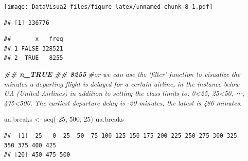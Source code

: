 \documentclass[
]{article}
\newenvironment{Shaded}{\begin{snugshade}}{\end{snugshade}}
\newcommand{\CommentTok}[1]{\textcolor[rgb]{0.56,0.35,0.01}{\textit{#1}}}
\newcommand{\DecValTok}[1]{\textcolor[rgb]{0.00,0.00,0.81}{#1}}
\newcommand{\DocumentationTok}[1]{\textcolor[rgb]{0.56,0.35,0.01}{\textbf{\textit{#1}}}}
\newcommand{\FunctionTok}[1]{\textcolor[rgb]{0.00,0.00,0.00}{#1}}
\newcommand{\NormalTok}[1]{#1}
\newcommand{\OtherTok}[1]{\textcolor[rgb]{0.56,0.35,0.01}{#1}}
\newcommand{\SpecialCharTok}[1]{\textcolor[rgb]{0.00,0.00,0.00}{#1}}
\begin{document}
\texttt{[image: DataVisua2\_files/figure-latex/unnamed-chunk-8-1.pdf]}

\begin{Shaded}
\end{Shaded}

\begin{verbatim}
## [1] 336776
\end{verbatim}

\begin{Shaded}
\end{Shaded}

\begin{verbatim}
##       x   freq
## 1 FALSE 328521
## 2  TRUE   8255
\end{verbatim}

\begin{Shaded}
\begin{Highlighting}[]
\DocumentationTok{\#\# n\_TRUE }
\DocumentationTok{\#\#   8255}
\CommentTok{\#or we can use the ‘filter’ function to visualize the minutes a departing flight is delayed for a certain airline, in the instance below UA (United Airlines) in addition to setting the class limits to: 0\textless{}25, 25\textless{}50, ⋯, 475\textless{}500. The earliest departure delay is {-}20 minutes, the latest is 486 minutes.}

\NormalTok{ua.breaks }\OtherTok{\textless{}{-}} \FunctionTok{seq}\NormalTok{(}\SpecialCharTok{{-}}\DecValTok{25}\NormalTok{, }\DecValTok{500}\NormalTok{, }\DecValTok{25}\NormalTok{)}
\NormalTok{ua.breaks}
\end{Highlighting}
\end{Shaded}

\begin{verbatim}
##  [1] -25   0  25  50  75 100 125 150 175 200 225 250 275 300 325 350 375 400 425
## [20] 450 475 500
\end{verbatim}
\end{document}
